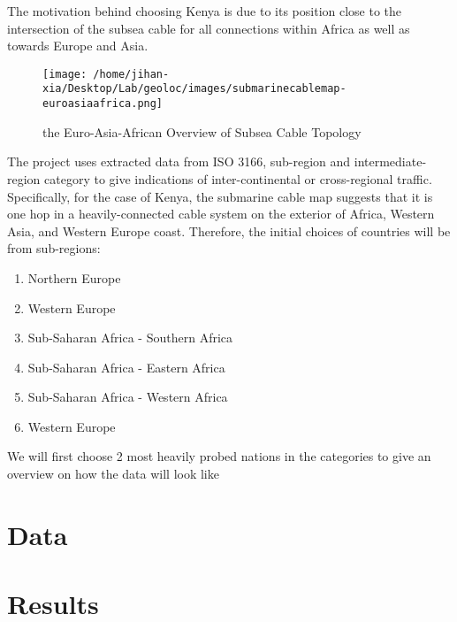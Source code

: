 \documentclass[twocolumn]{article}
\begin{document}
The motivation behind choosing Kenya is due to its position close to the intersection of the subsea cable for all connections within Africa as well as towards Europe and Asia. 
\begin{figure}
    \texttt{[image: /home/jihan-xia/Desktop/Lab/geoloc/images/submarinecablemap-euroasiaafrica.png]}
    \caption{the Euro-Asia-African Overview of Subsea Cable Topology}
\end{figure}
The project uses extracted data from ISO 3166, sub-region and intermediate-region category to give indications of inter-continental or cross-regional traffic. Specifically, for the case of Kenya, the submarine cable map suggests that it is one hop in a heavily-connected cable system on the exterior of Africa, Western Asia, and Western Europe coast. Therefore, the initial choices of countries will be from sub-regions:
\begin{enumerate}
    \item Northern Europe
    \item Western Europe  
    \item Sub-Saharan Africa - Southern Africa
    \item Sub-Saharan Africa - Eastern Africa
    \item Sub-Saharan Africa - Western Africa
    \item Western Europe
\end{enumerate}
We will first choose 2 most heavily probed nations in the categories to give an overview on how the data will look like
\section{Data}
\section{Results}
\end{document}
